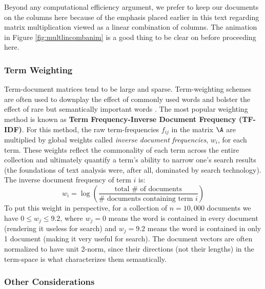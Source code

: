 \documentclass[
]{article}
\theoremstyle{definition}
\theoremstyle{definition}
\theoremstyle{definition}
\theoremstyle{definition}
\theoremstyle{remark}
\begin{document}
Beyond any computational efficiency argument, we prefer to keep our documents on the columns here because of the emphasis placed earlier in this text regarding matrix multiplication viewed as a linear combination of columns. The animation in Figure \ref{fig:multlincombanim} is a good thing to be clear on before proceeding here.

\hypertarget{term-weighting}{%
\subsubsection{Term Weighting}\label{term-weighting}}

Term-document matrices tend to be large and sparse. Term-weighting schemes are often used to downplay the effect of commonly used words and bolster the effect of rare but semantically important words \cite{termweighting, berryCIR}. The most popular weighting method is known as \textbf{Term Frequency-Inverse Document Frequency (TF-IDF)}. For this method, the raw term-frequencies \(f_{ij}\) in the matrix \(\A\) are multiplied by global weights called \emph{inverse document frequencies}, \(w_i\), for each term. These weights reflect the commonality of each term across the entire collection and ultimately quantify a term's ability to narrow one's search results (the foundations of text analysis were, after all, dominated by search technology). The inverse document frequency of term \(i\) is:
\[w_i = \log \left( \frac{\mbox{total # of documents}}{\mbox{# documents containing term  } i} \right)\]
To put this weight in perspective, for a collection of \(n=10,000\) documents we have \(0\leq w_j \leq 9.2\), where \(w_j=0\) means the word is contained in every document (rendering it useless for search) and \(w_j=9.2\) means the word is contained in only 1 document (making it very useful for search). The document vectors are often normalized to have unit 2-norm, since their directions (not their lengths) in the term-space is what characterizes them semantically.\\

\hypertarget{other-considerations}{%
\subsubsection{Other Considerations}\label{other-considerations}}
\end{document}
